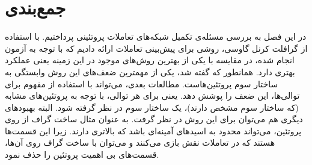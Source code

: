 \section{جمع‌بندی}
در این فصل به بررسی مسئله‌ی تکمیل شبکه‌های تعاملات پروتئینی پرداختیم. با استفاده از گرافلت کرنل گاوسی، روشی برای پیش‌بینی تعاملات ارائه دادیم که با توجه به آزمون انجام شده، در مقایسه با یکی از بهترین روش‌های موجود در این زمینه یعنی  عملکرد بهتری دارد. همانطور که گفته شد، یکی از مهمترین ضعف‌های این روش وابستگی به ساختار سوم پروتئین‌هاست. مطالعات بعدی، می‌تواند با استفاده از مفهوم  برای توالی‌ها، این ضعف را پوشش دهد. یعنی برای هر توالی، با توجه به پروتئین‌های مشابه (که ساختار سوم مشخص دارند)، یک ساختار سوم در نظر گرفته شود. البته بهبود‌های دیگری هم می‌توان برای این روش در نظر گرفت. به عنوان مثال ساخت گراف از روی پروتئین، می‌تواند محدود به اسید‌های آمینه‌ای باشد که  بالاتری دارند. زیرا این قسمت‌ها هستند که در تعاملات نقش بازی می‌کنند و می‌توان با ساخت گراف روی آن‌ها، قسمت‌های بی اهمیت پروتئین را حذف نمود. 
